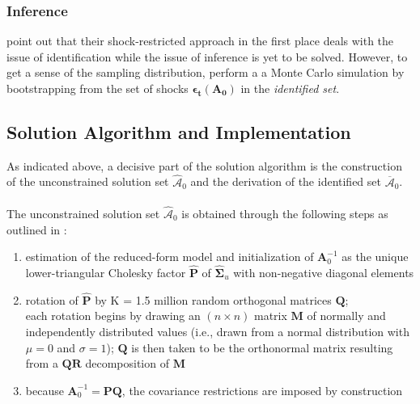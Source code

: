 \documentclass[a4paper,11pt,listof=nochaptergap,oneside,pointednumbers,bibtotoc,bigheadings,liststotoc,hidelinks]{scrbook}
\theoremstyle{mysatz}
\theoremstyle{mydefinition}
\theoremstyle{mytheorem}
\theoremstyle{mybemerkung}
\let\oldhat\hat
\newcommand{\vect}[1]{\boldsymbol{\mathbf{#1}}}
\newcommand{\hatt}[1]{\oldhat{\boldsymbol{\mathbf{#1}}}}
\begin{document}
\subsubsection{Inference}
\citet{ludvigsonetal:17} point out that their shock-restricted approach in the first place deals with the issue of identification while the issue of inference is yet to be solved. However, to get a sense of the sampling distribution, \citet{ludvigsonetal:17} perform a a Monte Carlo simulation by bootstrapping from the set of shocks $\vect{\epsilon_t}({\vect{A_0}})$ in the \textit{identified set}.


\subsection{Solution Algorithm and Implementation}
\label{sec:solutionAlgorithm}
As indicated above, a decisive part of the solution algorithm is the construction of the unconstrained solution set $\hatt{\mathcal{A}}_0$ and the derivation of the identified set $\overline{\vect{\mathcal{A}}}_0$. \\
\\
The unconstrained solution set $\hatt{\mathcal{A}}_0$ is obtained through the following steps as outlined in \citet{ludvigsonetal:18}:
\begin{enumerate}[i]
	\item estimation of the reduced-form model and initialization of $\vect{A}_0^{-1}$ as the unique lower-triangular Cholesky factor $\hatt{\vect{P}}$ of $\hatt{\vect{\Sigma}}_u$ with non-negative diagonal elements
	\item rotation of $\hatt{\vect{P}}$ by K = 1.5 million random orthogonal matrices $\vect{Q}$;\\
	 each rotation begins by drawing an $(n \times n)$ matrix $\vect{M}$ of normally and independently distributed values (i.e., drawn from a normal distribution with $\mu = 0$ and $\sigma = 1$); $\vect{Q}$ is then taken to be the orthonormal matrix resulting from a $\vect{Q}\vect{R}$ decomposition of $\vect{M}$
	 \item because $\vect{A}_0^{-1} = \vect{P}\vect{Q}$, the covariance restrictions are imposed by construction 
\end{enumerate}
\end{document}
